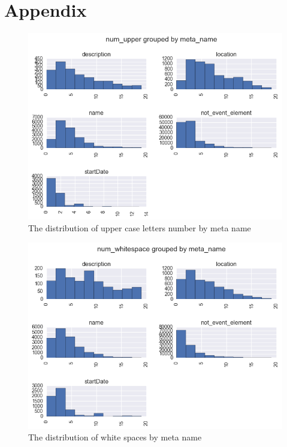 \chapter{Appendix}
\label{appendix}


\begin{figure}[h]
\begin{center}
\includegraphics[width=1.0\textwidth]{figures/distrUpperByMeta}
\caption{The distribution of upper case letters number by meta name}
\label{fig:distrUpperByMeta}
\end{center}
\end{figure}

\begin{figure}[h]
\begin{center}
\includegraphics[width=1.0\textwidth]{figures/distrWhiteByMeta}
\caption{The distribution of white spaces by meta name}
\label{fig:distrWhiteByMeta}
\end{center}
\end{figure}

